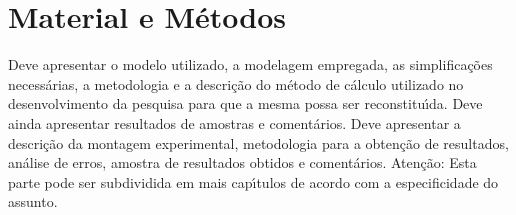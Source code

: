 
\chapter{Material e M\'etodos}\label{cap:materialemetodos}

Deve apresentar o modelo utilizado, a modelagem empregada, as simplifica\c{c}\~oes necess\'arias, a metodologia e a descri\c{c}\~ao do m\'etodo de c\'alculo utilizado no desenvolvimento da pesquisa para que a mesma possa ser reconstitu\'{\i}da. Deve ainda apresentar resultados de amostras e coment\'arios. Deve apresentar a descri\c{c}\~ao da montagem experimental, metodologia para a obten\c{c}\~ao de resultados, an\'alise de erros, amostra de resultados obtidos e coment\'arios. Aten\c{c}\~ao: Esta parte pode ser subdividida em mais cap\'{\i}tulos de acordo com a especificidade do assunto.
